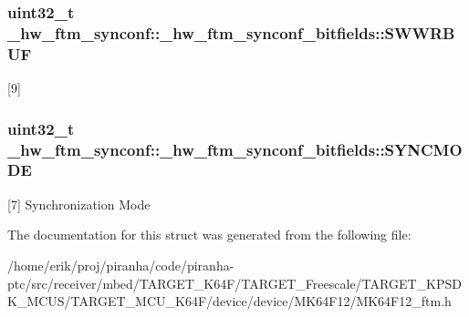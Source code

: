 \subsubsection[{\texorpdfstring{S\+W\+W\+R\+B\+UF}{SWWRBUF}}]{\setlength{\rightskip}{0pt plus 5cm}uint32\+\_\+t \+\_\+hw\+\_\+ftm\+\_\+synconf\+::\+\_\+hw\+\_\+ftm\+\_\+synconf\+\_\+bitfields\+::\+S\+W\+W\+R\+B\+UF}\hypertarget{struct__hw__ftm__synconf_1_1__hw__ftm__synconf__bitfields_a188601a567cce018525ece074d587d16}{}\label{struct__hw__ftm__synconf_1_1__hw__ftm__synconf__bitfields_a188601a567cce018525ece074d587d16}
\mbox{[}9\mbox{]} 
\subsubsection[{\texorpdfstring{S\+Y\+N\+C\+M\+O\+DE}{SYNCMODE}}]{\setlength{\rightskip}{0pt plus 5cm}uint32\+\_\+t \+\_\+hw\+\_\+ftm\+\_\+synconf\+::\+\_\+hw\+\_\+ftm\+\_\+synconf\+\_\+bitfields\+::\+S\+Y\+N\+C\+M\+O\+DE}\hypertarget{struct__hw__ftm__synconf_1_1__hw__ftm__synconf__bitfields_a1f1d0330e9e506021401c13595d8a331}{}\label{struct__hw__ftm__synconf_1_1__hw__ftm__synconf__bitfields_a1f1d0330e9e506021401c13595d8a331}
\mbox{[}7\mbox{]} Synchronization Mode 

The documentation for this struct was generated from the following file\+:\begin{DoxyCompactItemize}
\item 
/home/erik/proj/piranha/code/piranha-\/ptc/src/receiver/mbed/\+T\+A\+R\+G\+E\+T\+\_\+\+K64\+F/\+T\+A\+R\+G\+E\+T\+\_\+\+Freescale/\+T\+A\+R\+G\+E\+T\+\_\+\+K\+P\+S\+D\+K\+\_\+\+M\+C\+U\+S/\+T\+A\+R\+G\+E\+T\+\_\+\+M\+C\+U\+\_\+\+K64\+F/device/device/\+M\+K64\+F12/M\+K64\+F12\+\_\+ftm.\+h\end{DoxyCompactItemize}
